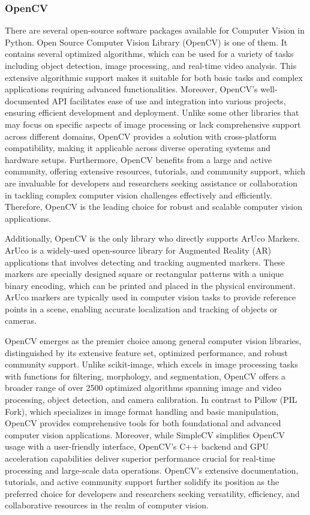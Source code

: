 \subsubsection{OpenCV}
There are several open-source software packages available for Computer Vision in Python.
Open Source Computer Vision Library (OpenCV) is one of them.
It contains several optimized algorithms, which can be used for a variety of tasks including object detection, image processing, and real-time video analysis.
This extensive algorithmic support makes it suitable for both basic tasks and complex applications requiring advanced functionalities.
Moreover, OpenCV's well-documented API facilitates ease of use and integration into various projects, ensuring efficient development and deployment.
Unlike some other libraries that may focus on specific aspects of image processing or lack comprehensive support across different domains, OpenCV provides a solution with cross-platform compatibility, making it applicable across diverse operating systems and hardware setups.
Furthermore, OpenCV benefits from a large and active community, offering extensive resources, tutorials, and community support, which are invaluable for developers and researchers seeking assistance or collaboration in tackling complex computer vision challenges effectively and efficiently.
Therefore, OpenCV is the leading choice for robust and scalable computer vision applications.



Additionally, OpenCV is the only library who directly supports ArUco Markers.
ArUco is a widely-used open-source library for Augmented Reality (AR) applications that involves detecting and tracking augmented markers.
These markers are specially designed square or rectangular patterns with a unique binary encoding, which can be printed and placed in the physical environment.
ArUco markers are typically used in computer vision tasks to provide reference points in a scene, enabling accurate localization and tracking of objects or cameras.

OpenCV emerges as the premier choice among general computer vision libraries, distinguished by its extensive feature set, optimized performance, and robust community support.
Unlike scikit-image, which excels in image processing tasks with functions for filtering, morphology, and segmentation, OpenCV offers a broader range of over 2500 optimized algorithms spanning image and video processing, object detection, and camera calibration.
In contrast to Pillow (PIL Fork), which specializes in image format handling and basic manipulation, OpenCV provides comprehensive tools for both foundational and advanced computer vision applications.
Moreover, while SimpleCV simplifies OpenCV usage with a user-friendly interface, OpenCV's C++ backend and GPU acceleration capabilities deliver superior performance crucial for real-time processing and large-scale data operations.
OpenCV's extensive documentation, tutorials, and active community support further solidify its position as the preferred choice for developers and researchers seeking versatility, efficiency, and collaborative resources in the realm of computer vision.

